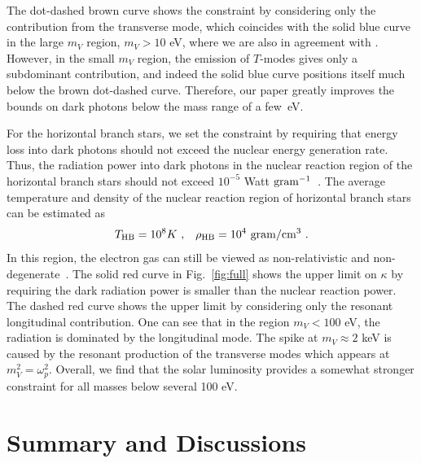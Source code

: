 \documentclass[12pt]{article}
\begin{document}
The dot-dashed brown curve shows the constraint by considering only
the contribution from the transverse mode, which coincides with the
solid blue curve in the large $m_V$ region, $m_V > 10$ eV, where we
are also in agreement with \cite{Redondo:2008aa}. However, in the
small $m_V$ region, the emission of $T$-modes gives only a subdominant
contribution, and indeed the solid blue curve positions itself much
below the brown dot-dashed curve. Therefore, our paper greatly
improves the bounds on dark photons below the mass range of a few~eV.

For the horizontal branch stars, we set the constraint by requiring 
that energy loss into dark photons should not exceed the nuclear energy 
generation rate. Thus,  the radiation power into dark photons in the nuclear reaction region of the horizontal branch stars should not exceed $10^{-5}$ Watt ${\rm gram}^{-1}$~\cite{Frieman:1987ui,Raffelt:1987yb}. The average temperature and density of the nuclear reaction region of horizontal branch stars can be estimated as
\begin{equation}
T_{\rm HB} = 10^8 K\ , \;\;\; \rho_{\rm HB} = 10^4 {\rm~gram/cm^3} \ .
\end{equation}
In this region, the electron gas can still be viewed as non-relativistic and non-degenerate~\cite{Grifols:1988fv}. The solid red curve in Fig.~\ref{fig:full} 
shows the upper limit on $\kappa$ by requiring the dark radiation power is smaller than the nuclear reaction power. The dashed red curve shows the upper limit by considering only the resonant longitudinal contribution. One can see that in the region $m_V < 100$ eV, the radiation is dominated by the longitudinal mode. The spike at $m_V\approx2$ keV is caused by the resonant production of the transverse modes which appears at $m_V^2 = \omega_p^2$. Overall, we find that the solar luminosity provides a somewhat stronger 
constraint for all masses below several 100 eV. 

\section{Summary and Discussions}
\end{document}
